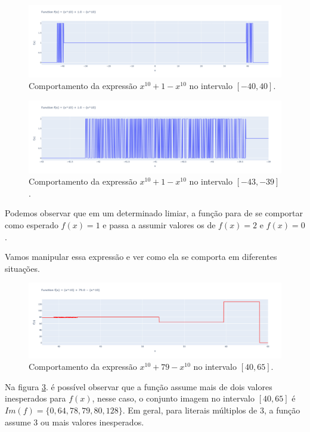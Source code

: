 \begin{figure}[h]
    \centering 
    \includegraphics[width=1\textwidth]{Imagens/catastrofic_cancelation.png}
    \caption{Comportamento da expressão \(x^{10} + 1 - x^{10}\) no intervalo \([-40, 40]\).}
    \label{fig:catastrofic_cancelation}
\end{figure}
\begin{figure}[h]
    \centering 
    \includegraphics[width=1\textwidth]{Imagens/zoom.png}
    \caption{Comportamento da expressão \(x^{10} + 1 - x^{10}\) no intervalo \([-43, -39]\).}
    \label{fig:zoom}
\end{figure}

Podemos observar que em um determinado limiar, a função para de se comportar como esperado $f(x) = 1$ e passa a assumir valores os de  $f(x) = 2$ e $f(x) = 0$.

Vamos manipular essa expressão e ver como ela se comporta em diferentes situações.

\begin{figure}[h]
    \centering 
    \includegraphics[width=1\textwidth]{Imagens/literal79.png}
    \caption{Comportamento da expressão \(x^{10} + 79 - x^{10}\) no intervalo \([40, 65]\).}
    \label{fig:literal79}
\end{figure}

Na figura  \ref{fig:literal79}. é possível observar que a função assume mais de dois valores inesperados para $f(x)$, nesse caso, o conjunto imagem no intervalo \([40, 65]\) é \( Im(f)  = \bigl\{ {0{,}64{,}78{,}79{,}80{,}128}\}\). Em geral, para literais múltiplos de 3, a função assume 3 ou mais valores inesperados.

